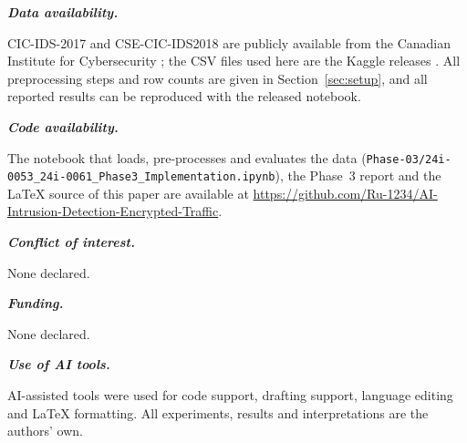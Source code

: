 \documentclass[pdflatex,sn-mathphys-num,iicol]{sn-jnl}%
\begin{document}
\newcommand{\declhead}[1]{\par\medskip\noindent\textbf{\textit{#1}}\par\smallskip\noindent\ignorespaces}

\declhead{Data availability.}
CIC-IDS-2017 and CSE-CIC-IDS2018 are publicly available from the Canadian Institute for Cybersecurity \cite{sharafaldin2018cicids}; the CSV files used here are the Kaggle releases \cite{kaggle2017,kaggle2018}. All preprocessing steps and row counts are given in Section~\ref{sec:setup}, and all reported results can be reproduced with the released notebook.

\declhead{Code availability.}
The notebook that loads, pre-processes and evaluates the data (\texttt{Phase-03/\allowbreak 24i-0053\_\allowbreak 24i-0061\_\allowbreak Phase3\_\allowbreak Implementation.ipynb}), the Phase~3 report and the \LaTeX{} source of this paper are available at \url{https://github.com/Ru-1234/AI-Intrusion-Detection-Encrypted-Traffic}.

\declhead{Conflict of interest.}
None declared.

\declhead{Funding.}
None declared.

\declhead{Use of AI tools.}
AI-assisted tools were used for code support, drafting support, language editing and LaTeX formatting. All experiments, results and interpretations are the authors’ own. 


\end{document}
